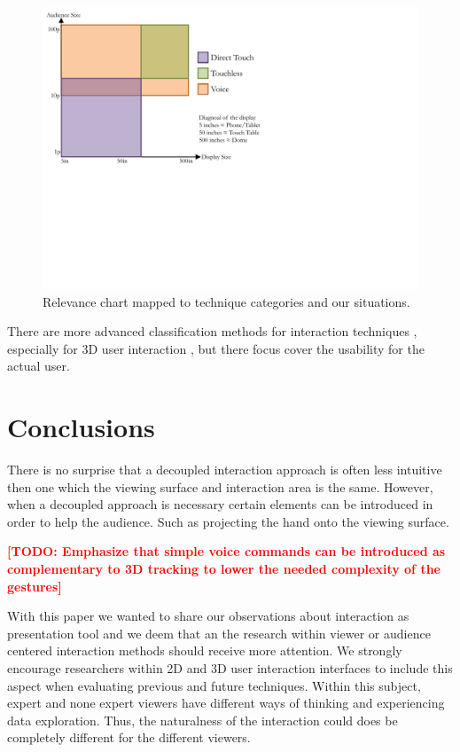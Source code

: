 \documentclass[review,journal]{vgtc}         %
\newcommand{\todo}[1]{\textbf{\textcolor{red}{[TODO: {#1}]}}}
\begin{document}
\begin{figure}[htb]
	\centering
	\includegraphics[width=1.0\linewidth]{classifiy_diagram.pdf}
	\caption{Relevance chart mapped to technique categories and our situations.}
	\label{classifiy_diagram}
\end{figure}

There are more advanced classification methods for interaction techniques \cite{stars:65-93:2012}, especially for 3D user interaction \cite{CGF:CGF194, Kettner95aclassification, 978-3-319-07458-0_1}, but there focus cover the usability for the actual user.

\section{Conclusions}\label{sec:conclusion}

There is no surprise that a decoupled interaction approach is often less intuitive then one which the viewing surface and interaction area is the same.
However, when a decoupled approach is necessary certain elements can be introduced in order to help the audience.
Such as projecting the hand onto the viewing surface.

\todo{Emphasize that simple voice commands can be introduced as complementary to 3D tracking to lower the needed complexity of the gestures}

With this paper we wanted to share our observations about interaction as presentation tool and we deem that an the research within viewer or audience centered interaction methods should receive more attention. We strongly encourage researchers within 2D and 3D user interaction interfaces to include this aspect when evaluating previous and future techniques.
Within this subject, expert and none expert viewers have different ways of thinking and experiencing data exploration. Thus, the naturalness of the interaction could does be completely different for the different viewers.



\end{document}
